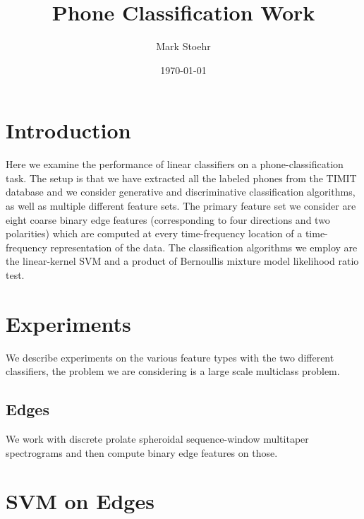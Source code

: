 \documentclass{article}
\title{Phone Classification Work}
\author{Mark Stoehr}
\date{\today}
\begin{document}
\maketitle
\tableofcontents

\section{Introduction}

Here we examine the performance of linear classifiers on a phone-classification task.  The setup is that we have
extracted all the labeled phones from the TIMIT database and we consider generative and discriminative classification
algorithms, as well as multiple different feature sets.  The primary feature set we consider are eight coarse binary edge features
(corresponding to four directions and two polarities) which are computed
at every time-frequency location of a time-frequency representation of the data.  The classification algorithms we employ
are the linear-kernel SVM and a product of Bernoullis mixture model likelihood ratio test.

\section{Experiments}

We describe experiments on the various feature types with the two different classifiers, the problem we are considering is a large
scale multiclass problem.

\subsection{Edges}

We work with discrete prolate spheroidal sequence-window multitaper spectrograms and then compute binary edge features on those.

\section{SVM on Edges}
\end{document}
